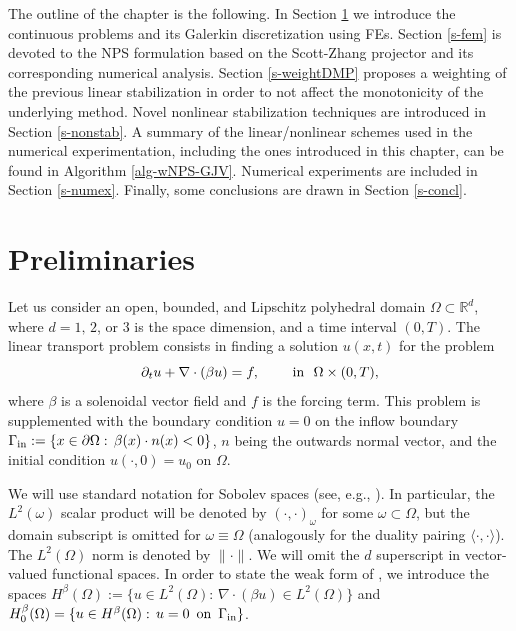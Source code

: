 The outline of the chapter is the following. In Section \ref{s-prel} we introduce the continuous problems and its
Galerkin discretization using FEs. Section \ref{s-fem} is devoted to the NPS formulation based on the Scott-Zhang projector and its corresponding numerical analysis. Section \ref{s-weightDMP} proposes a weighting of the previous linear stabilization in order to not affect the monotonicity of the underlying method. Novel nonlinear stabilization techniques are introduced in Section \ref{s-nonstab}. A summary of the linear/nonlinear schemes used in the numerical experimentation, including the ones introduced in this chapter, can be found in Algorithm \ref{alg-wNPS-GJV}. Numerical experiments are included in Section \ref{s-numex}. Finally, some conclusions are drawn in Section \ref{s-concl}.


\section{Preliminaries}\label{s-prel}

Let us consider an open, bounded, and Lipschitz  polyhedral domain $\Omega \subset \mathbb{R}^d$, where $d = 1,\, 2$, or $3$ is the space dimension, and a time interval $(0,T)$. The linear transport problem consists in finding a solution $u(x,t)$ for the problem
\begin{equation}\label{eq-probcont}
\partial_t u +   \nabla \cdot (\beta u) = f, \qquad \hbox{ in } \ \Omega \times (0,T),
\end{equation}
where $\beta$ is a solenoidal vector field and $f$ is the forcing term. This problem is supplemented with the boundary condition $u = 0$ on the inflow boundary $\Gamma_{\rm in} := \{ x \in \partial \Omega: \, \beta(x) \cdot n(x) < 0\}$, $n$ being the outwards normal vector, and the initial condition $u(\cdot,0) = u_0$ on $\Omega$. %

We will use standard notation for Sobolev spaces (see, e.g., \cite{brezis_functional_2010}). In particular, the $L^2(\omega)$ scalar product will be denoted by $(\cdot,\cdot)_\omega$ for some $\omega \subset \Omega$, but the domain subscript is omitted for $\omega \equiv \Omega$ (analogously for the duality pairing $\langle \cdot,\cdot \rangle$). The $L^2(\Omega)$ norm is denoted by $\|\cdot\|$. 
We will omit the $d$ superscript in vector-valued functional spaces. In order to state the weak form of , we introduce the spaces $H^\beta(\Omega) := \{ u \in L^2(\Omega): \,  \nabla \cdot (\beta u) \in L^2(\Omega) \}$ and $H_0^\beta(\Omega) = \{ u \in H^\beta(\Omega):\, u = 0 \, \hbox{ on } \,\Gamma_{\rm in}\}$. 

